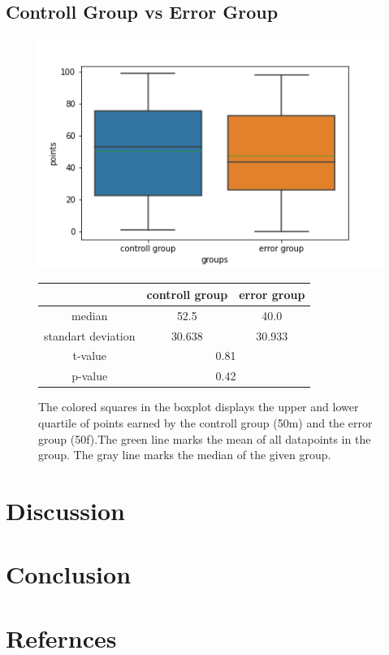 \documentclass[runningheads]{llncs}
\begin{document}
\subsection{Controll Group vs Error Group}
\begin{figure}
    \begin{minipage}{0.45\textwidth}        
        \includegraphics[width=\textwidth]{code/generate/all.png}
        \caption{The colored squares in the boxplot displays
        the upper and lower quartile of points earned by the controll group (50m) and
        the error group (50f).The green line marks the mean of all datapoints in the group.
        The gray line marks the median  of the given group.} \label{fig8}
    \end{minipage}
\hfill
\begin{minipage}{0.45\textwidth}
\begin{tabular}[]{| c | c | c |}
        \hline
        & controll group & error group \\
        \hline
        median & 52.5&40.0 \\
        \hline
        standart deviation & 30.638&30.933 \\
        \hline
        t-value & \multicolumn{2}{c|}{0.81} \\
        \hline
        p-value & \multicolumn{2}{c|}{0.42} \\
        \hline            
\end{tabular}
\end{minipage}
\end{figure}






\section{Discussion}
\section{Conclusion}
\section{Refernces}
\end{document}
